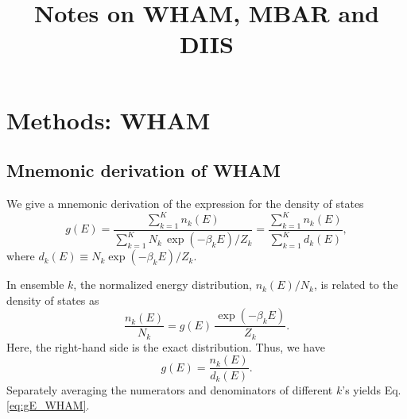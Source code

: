 \documentclass[aip,jcp,preprint,notitlepage, superscriptaddress]{revtex4-1}
\begin{document}
\renewcommand{\theequation}{N.\arabic{equation}}

\newcommand{\vct}[1]{\mathbf{#1}}
\newcommand{\vx}{\vct{x}}
\newcommand{\vy}{\vct{y}}
\newcommand{\Z}{\mathcal{Z}}
\newcommand{\E}{\mathcal{E}}
\newcommand{\Ham}{\mathcal{H}}
\newcommand{\W}{\mathcal{W}}
\newcommand{\A}{\mathcal{A}}
\newcommand{\var}{\mathrm{var}}

\newcommand{\repl}[2]{{\color{gray} [#1] }{\color{blue} #2}}
\newcommand{\add}[1]{{\color{blue} #1}}
\newcommand{\del}[1]{{\color{gray} [#1]}}
\newcommand{\note}[1]{{\color{OliveGreen}\small [\textbf{Comment.} #1]}}




\title{Notes on WHAM, MBAR and DIIS}

\maketitle


\tableofcontents



\section{Methods: WHAM}



\subsection{Mnemonic derivation of WHAM}



We give a mnemonic derivation of the expression
for the density of states
%
\begin{equation}
g(E)
=
\frac{
  \sum_{k = 1}^K n_k(E)
}
{
  \sum_{k = 1}^K N_k \, \exp(-\beta_k E) / Z_k
}
=
\frac{
  \sum_{k = 1}^K n_k(E)
}
{
  \sum_{k = 1}^K d_k(E)
},
\label{eq:gE_WHAM}
\end{equation}
%
where
$d_k(E) \equiv N_k \exp(-\beta_k E) / Z_k$.



In ensemble $k$,
the normalized energy distribution,
$n_k(E) / N_k$,
is related to the density of states as
%
\begin{equation}
\frac{ n_k(E) } { N_k }
=
g(E) \,
\frac{ \exp(-\beta_k E) } { Z_k }.
\end{equation}
%
Here, the right-hand side
is the exact distribution.
%
Thus,
we have
%
\begin{equation}
g(E)
=
\frac{ n_k(E) }
     { d_k(E) }.
\label{eq:gnk}
\end{equation}
%
Separately averaging the numerators and denominators of different $k$'s
yields Eq. \eqref{eq:gE_WHAM}.
\end{document}
